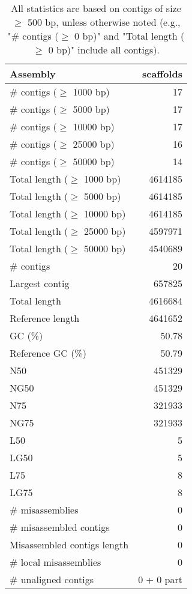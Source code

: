 \documentclass[12pt,a4paper]{article}
\begin{document}
\begin{table}[ht]
\begin{center}
\caption{All statistics are based on contigs of size $\geq$ 500 bp, unless otherwise noted (e.g., "\# contigs ($\geq$ 0 bp)" and "Total length ($\geq$ 0 bp)" include all contigs).}
\begin{tabular}{|l*{1}{|r}|}
\hline
Assembly & scaffolds \\ \hline
\# contigs ($\geq$ 1000 bp) & 17 \\ \hline
\# contigs ($\geq$ 5000 bp) & 17 \\ \hline
\# contigs ($\geq$ 10000 bp) & 17 \\ \hline
\# contigs ($\geq$ 25000 bp) & 16 \\ \hline
\# contigs ($\geq$ 50000 bp) & 14 \\ \hline
Total length ($\geq$ 1000 bp) & 4614185 \\ \hline
Total length ($\geq$ 5000 bp) & 4614185 \\ \hline
Total length ($\geq$ 10000 bp) & 4614185 \\ \hline
Total length ($\geq$ 25000 bp) & 4597971 \\ \hline
Total length ($\geq$ 50000 bp) & 4540689 \\ \hline
\# contigs & 20 \\ \hline
Largest contig & 657825 \\ \hline
Total length & 4616684 \\ \hline
Reference length & 4641652 \\ \hline
GC (\%) & 50.78 \\ \hline
Reference GC (\%) & 50.79 \\ \hline
N50 & 451329 \\ \hline
NG50 & 451329 \\ \hline
N75 & 321933 \\ \hline
NG75 & 321933 \\ \hline
L50 & 5 \\ \hline
LG50 & 5 \\ \hline
L75 & 8 \\ \hline
LG75 & 8 \\ \hline
\# misassemblies & 0 \\ \hline
\# misassembled contigs & 0 \\ \hline
Misassembled contigs length & 0 \\ \hline
\# local misassemblies & 0 \\ \hline
\# unaligned contigs & 0 + 0 part \\ \hline

\end{tabular}
\end{center}
\end{table}
\end{document}
